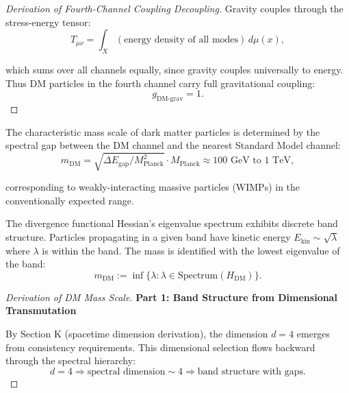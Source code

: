\begin{theorem}
\begin{proof}[Derivation of Fourth-Channel Coupling Decoupling]
Gravity couples through the stress-energy tensor:
\begin{equation}
T_{\mu\nu} = \int_X (\text{energy density of all modes}) \, d\mu(x),
\end{equation}

which sums over all channels equally, since gravity couples universally to energy. Thus DM particles in the fourth channel carry full gravitational coupling:
\begin{equation}
g_{\text{DM-grav}} = 1.
\end{equation}

\end{proof}

\end{theorem}

\begin{theorem}
\label{thm:DMMassScale}

The characteristic mass scale of dark matter particles is determined by the spectral gap between the DM channel and the nearest Standard Model channel:
\begin{equation}
m_{\text{DM}} = \sqrt{\Delta E_{\text{gap}} / M_{\text{Planck}}^2} \cdot M_{\text{Planck}} \approx 100 \text{ GeV} \text{ to } 1 \text{ TeV},
\end{equation}

corresponding to weakly-interacting massive particles (WIMPs) in the conventionally expected range.

\begin{definition}

The divergence functional Hessian's eigenvalue spectrum exhibits discrete band structure. Particles propagating in a given band have kinetic energy $E_{\text{kin}} \sim \sqrt{\lambda}$ where $\lambda$ is within the band. The mass is identified with the lowest eigenvalue of the band:
\begin{equation}
m_{\text{DM}} := \inf \{\lambda : \lambda \in \text{Spectrum}(H_{\text{DM}})\}.
\end{equation}

\end{definition}

\begin{proof}[Derivation of DM Mass Scale]

\textbf{Part 1: Band Structure from Dimensional Transmutation}

By Section K (spacetime dimension derivation), the dimension $d = 4$ emerges from consistency requirements. This dimensional selection flows backward through the spectral hierarchy:
\begin{equation}
d = 4 \Rightarrow \text{spectral dimension} \sim 4 \Rightarrow \text{band structure with gaps}.
\end{equation}


\end{proof}
\end{theorem}
